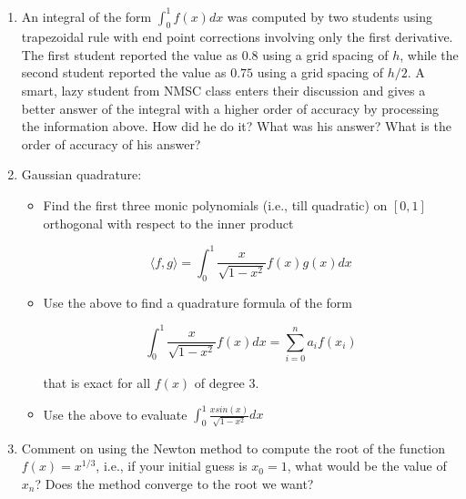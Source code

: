 \documentclass{article}
\begin{document}
	\begin{enumerate}

		\item An integral of the form $\displaystyle \int_{0}^{1} f(x) dx$ was computed
        by two students using trapezoidal rule with end point corrections involving only
        the first derivative. The first student reported the value as $0.8$ using a grid
        spacing of $h$, while the second student reported the value as $0.75$ using a grid
        spacing of $h/2$. A smart, lazy student from NMSC class enters their discussion
        and gives a better answer of the integral with a higher order of accuracy by processing
        the information above. How did he do it? What was his answer? What is the order of
        accuracy of his answer?

        \item Gaussian quadrature:
            \begin{itemize}
                \item Find the first three monic polynomials (i.e., till quadratic) on
                $[0, 1]$ orthogonal with respect to the inner product

                    \begin{equation*}
                        \langle f, g \rangle = \int_{0}^{1} \frac{x}{\sqrt{1 - x^{2}}} f(x) g(x) dx
                    \end{equation*}

                \item Use the above to find a quadrature formula of the form

                    \begin{equation*}
                        \int_{0}^{1} \frac{x}{\sqrt{1 - x^{2}}} f(x) dx = \sum_{i=0}^{n} a_{i} f(x_{i})
                    \end{equation*}

                    that is exact for all $f(x)$ of degree $3$.

                \item Use the above to evaluate $\displaystyle \int_{0}^{1} \frac{x sin(x)}{\sqrt{1 -
                x^{2}}} dx$ 
            \end{itemize}

        \item Comment on using the Newton method to compute the root of the function $f(x)
        = x^{1/3}$, i.e., if your initial guess is $x_{0} = 1$, what would be the value of
        $x_{n}$? Does the method converge to the root we want?


\end{enumerate}
\end{document}
